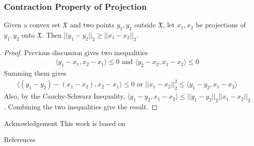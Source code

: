 \begin{frame}\frametitle{Contraction Property of Projection}
    \begin{theorem}
        Given a convex set $\mathfrak{X}$ and two points $y_1, y_2$ outside $\mathfrak{X}$, let $x_1, x_2$ be projections of $y_1, y_2$ onto $\mathfrak{X}$. Then $||y_1 - y_2||_2 \geq ||x_1 - x_2||_2$.
    \end{theorem}
    \begin{proof}
        Previous discussion gives two inequalities 
        \begin{gather*}
            \langle y_1 - x_1, x_2 - x_1 \rangle \leq 0 \text{ and } \langle y_2 - x_2, x_1 - x_2 \rangle \leq 0
        \end{gather*}
        Summing them gives
        \begin{gather*}
            \langle (y_1 - y_2)-(x_1 - x_2), x_2 - x_1 \rangle \leq 0 \text{ or } ||x_1 - x_2||_2^2 \leq \langle y_1 - y_2, x_1 - x_2\rangle
        \end{gather*}
        Also, by the Cauchy-Schwarz Inequality, $\langle y_1 - y_2, x_1 - x_2\rangle \leq ||y_1-y_2||_2 ||x_1-x_2||_2$. Combining the two inequalities give the result.
    \end{proof}
\end{frame}



\begin{frame}{Acknowledgement}
    This work is based on \cite{bubeck2015convex, deisenroth2020mathematics, Beck2017, bubeck2015convex}
\end{frame}

\begin{frame}[t, allowframebreaks]{References}
    \printbibliography
\end{frame}
